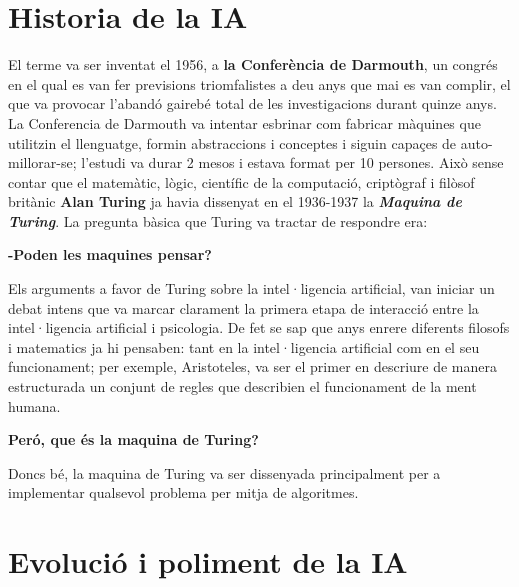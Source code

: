 \section{Historia de la IA}

El terme va ser inventat el 1956, a \textbf{la Conferència de Darmouth}, un congrés en el qual es van fer previsions triomfalistes a deu anys que mai es van complir, el que va provocar l'abandó gairebé total de les investigacions durant quinze anys. La Conferencia de Darmouth va intentar esbrinar com fabricar màquines que utilitzin el llenguatge, formin abstraccions i conceptes i siguin capaçes de auto-millorar-se; l'estudi va durar 2 mesos i estava format per 10 persones. Això sense contar que el matemàtic, lògic, científic de la computació, criptògraf  i filòsof britànic \textbf{Alan Turing} ja havia dissenyat en el 1936-1937 la \textbf{\emph{Maquina de Turing}}. La pregunta bàsica que Turing va tractar de respondre era: \cite{MaTur}

\textbf{-Poden les maquines pensar?}

Els arguments a favor de Turing sobre la intel·ligencia artificial, van iniciar un debat intens que va marcar clarament la primera etapa de interacció entre la intel·ligencia artificial i psicologia. De fet se sap que anys enrere diferents filosofs i matematics ja hi pensaben: tant en la intel·ligencia artificial com en el seu funcionament; per exemple, Aristoteles, va ser el primer en descriure de manera estructurada un conjunt de regles que describien el funcionament de la ment humana.\cite{IAgen}

\textbf{Peró, que és la maquina de Turing?}

Doncs bé, la maquina de Turing va ser dissenyada principalment per a implementar qualsevol problema per mitja de algoritmes.\cite {Algor}

\section{Evolució i poliment de la IA}

